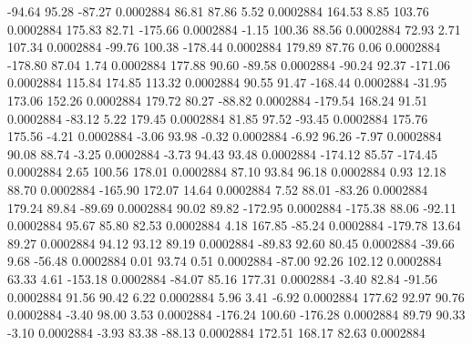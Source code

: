       -94.64       95.28      -87.27     0.0002884
       86.81       87.86        5.52     0.0002884
      164.53        8.85      103.76     0.0002884
      175.83       82.71     -175.66     0.0002884
       -1.15      100.36       88.56     0.0002884
       72.93        2.71      107.34     0.0002884
      -99.76      100.38     -178.44     0.0002884
      179.89       87.76        0.06     0.0002884
     -178.80       87.04        1.74     0.0002884
      177.88       90.60      -89.58     0.0002884
      -90.24       92.37     -171.06     0.0002884
      115.84      174.85      113.32     0.0002884
       90.55       91.47     -168.44     0.0002884
      -31.95      173.06      152.26     0.0002884
      179.72       80.27      -88.82     0.0002884
     -179.54      168.24       91.51     0.0002884
      -83.12        5.22      179.45     0.0002884
       81.85       97.52      -93.45     0.0002884
      175.76      175.56       -4.21     0.0002884
       -3.06       93.98       -0.32     0.0002884
       -6.92       96.26       -7.97     0.0002884
       90.08       88.74       -3.25     0.0002884
       -3.73       94.43       93.48     0.0002884
     -174.12       85.57     -174.45     0.0002884
        2.65      100.56      178.01     0.0002884
       87.10       93.84       96.18     0.0002884
        0.93       12.18       88.70     0.0002884
     -165.90      172.07       14.64     0.0002884
        7.52       88.01      -83.26     0.0002884
      179.24       89.84      -89.69     0.0002884
       90.02       89.82     -172.95     0.0002884
     -175.38       88.06      -92.11     0.0002884
       95.67       85.80       82.53     0.0002884
        4.18      167.85      -85.24     0.0002884
     -179.78       13.64       89.27     0.0002884
       94.12       93.12       89.19     0.0002884
      -89.83       92.60       80.45     0.0002884
      -39.66        9.68      -56.48     0.0002884
        0.01       93.74        0.51     0.0002884
      -87.00       92.26      102.12     0.0002884
       63.33        4.61     -153.18     0.0002884
      -84.07       85.16      177.31     0.0002884
       -3.40       82.84      -91.56     0.0002884
       91.56       90.42        6.22     0.0002884
        5.96        3.41       -6.92     0.0002884
      177.62       92.97       90.76     0.0002884
       -3.40       98.00        3.53     0.0002884
     -176.24      100.60     -176.28     0.0002884
       89.79       90.33       -3.10     0.0002884
       -3.93       83.38      -88.13     0.0002884
      172.51      168.17       82.63     0.0002884
